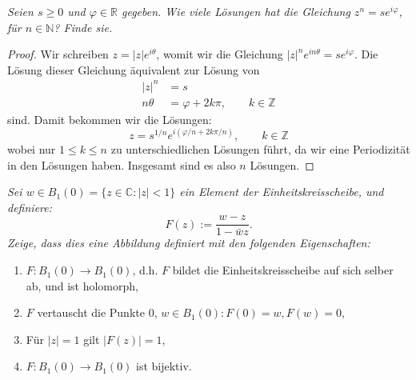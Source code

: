 \documentclass[11pt]{article}
\newcommand{\N}{\mathbb{N}}
\newcommand{\Z}{\mathbb{Z}}
\newcommand{\R}{\mathbb{R}}
\newcommand{\C}{\mathbb{C}}
\newenvironment{problem}[2][Beispiel]{
    \begin{trivlist}
        \item[\hskip \labelsep {\bfseries #1}\hskip \labelsep {\bfseries #2.}] \itshape}{
    \end{trivlist}\normalshape
}
\begin{document}
    \begin{problem}{2}
        Seien $s\geq 0$ und $\varphi\in\R$ gegeben. Wie viele Lösungen hat die
        Gleichung $z^n = se^{i\varphi}$, für $n\in \N$? Finde sie.
    \end{problem}

    \begin{proof}
        Wir schreiben $z = |z|e^{i\theta}$, womit wir die Gleichung $|z|^n e^{in\theta} = se^{i\varphi}$.
        Die Lösung dieser Gleichung äquivalent zur Lösung von
        $$\begin{aligned}
              |z|^n &= s\\
              n\theta &= \varphi +2k\pi, \qquad k\in \Z
        \end{aligned}$$
        sind. Damit bekommen wir die Lösungen:
        $$z = s^{1/n} e^{i(\varphi/n+2k\pi/n)}, \qquad k\in \Z$$
        wobei nur $1\leq k \leq n$ zu unterschiedlichen Lösungen führt, da wir eine Periodizität
        in den Lösungen haben. Insgesamt sind es also $n$ Lösungen.
    \end{proof}

    \begin{problem}{3}
        Sei $w\in B_1(0)=\{z\in\C:|z|<1\}$ ein Element der Einheitskreisscheibe,
        und definiere:
        $$F(z):= \dfrac{w-z}{1-\bar{w}z}.$$
        Zeige, dass dies eine Abbildung definiert mit den folgenden Eigenschaften:
        \begin{enumerate}[label=(\alph*)]
            \item $F:B_1(0)\to B_1(0)$, d.h. $F$ bildet die Einheitskreisscheibe
            auf sich selber ab, und ist holomorph,
            \item $F$ vertauscht die Punkte $0$, $w\in B_1(0): F(0)=w,F(w)=0$,
            \item Für $|z|=1$ gilt $|F(z)|=1$,
            \item $F:B_1(0)\to B_1(0)$ ist bijektiv.
        \end{enumerate}
    \end{problem}
\end{document}
